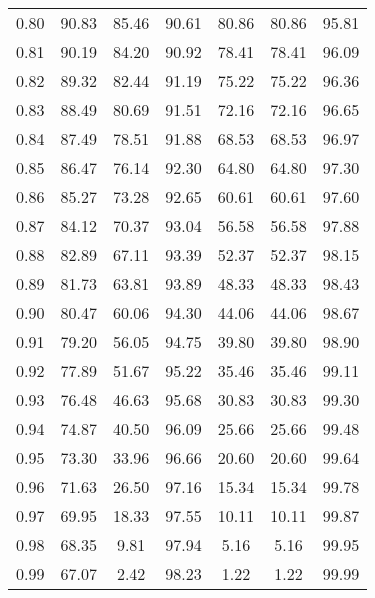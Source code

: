 \begin{tabular}{|c|c|c|c|c|c|c|}
      0.80 &     90.83 &     85.46 &      90.61 &   80.86 &      80.86 &         95.81 \\
      0.81 &     90.19 &     84.20 &      90.92 &   78.41 &      78.41 &         96.09 \\
      0.82 &     89.32 &     82.44 &      91.19 &   75.22 &      75.22 &         96.36 \\
      0.83 &     88.49 &     80.69 &      91.51 &   72.16 &      72.16 &         96.65 \\
      0.84 &     87.49 &     78.51 &      91.88 &   68.53 &      68.53 &         96.97 \\
      0.85 &     86.47 &     76.14 &      92.30 &   64.80 &      64.80 &         97.30 \\
      0.86 &     85.27 &     73.28 &      92.65 &   60.61 &      60.61 &         97.60 \\
      0.87 &     84.12 &     70.37 &      93.04 &   56.58 &      56.58 &         97.88 \\
      0.88 &     82.89 &     67.11 &      93.39 &   52.37 &      52.37 &         98.15 \\
      0.89 &     81.73 &     63.81 &      93.89 &   48.33 &      48.33 &         98.43 \\
      0.90 &     80.47 &     60.06 &      94.30 &   44.06 &      44.06 &         98.67 \\
      0.91 &     79.20 &     56.05 &      94.75 &   39.80 &      39.80 &         98.90 \\
      0.92 &     77.89 &     51.67 &      95.22 &   35.46 &      35.46 &         99.11 \\
      0.93 &     76.48 &     46.63 &      95.68 &   30.83 &      30.83 &         99.30 \\
      0.94 &     74.87 &     40.50 &      96.09 &   25.66 &      25.66 &         99.48 \\
      0.95 &     73.30 &     33.96 &      96.66 &   20.60 &      20.60 &         99.64 \\
      0.96 &     71.63 &     26.50 &      97.16 &   15.34 &      15.34 &         99.78 \\
      0.97 &     69.95 &     18.33 &      97.55 &   10.11 &      10.11 &         99.87 \\
      0.98 &     68.35 &      9.81 &      97.94 &    5.16 &       5.16 &         99.95 \\
      0.99 &     67.07 &      2.42 &      98.23 &    1.22 &       1.22 &         99.99 \\
\bottomrule
\end{tabular}
